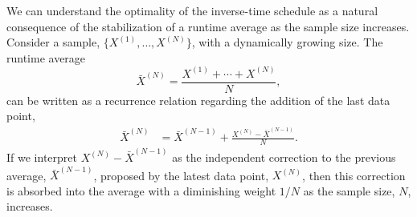 \documentclass[reprint, superscriptaddress, floatfix]{revtex4-1}
\begin{document}
We can understand the optimality of the inverse-time schedule
as a natural consequence of the stabilization of a runtime average
as the sample size increases\cite{
  marsili2006, barducci2008}.
%
Consider a sample, $\{X^{(1)}, \dots, X^{(N)}\}$,
with a dynamically growing size.
%
The runtime average
%
\begin{equation*}
  {\bar X}^{(N)}
  =
  \frac{ X^{(1)} + \cdots + X^{(N)} } { N }
  ,
\end{equation*}
%
can be written as a recurrence relation regarding
the addition of the last data point,
%
\begin{align}
  {\bar X}^{(N)}
  &=
  {\bar X}^{(N-1)} + \frac{ X^{(N)} - {\bar X}^{(N-1)} } { N }
  .
  \label{eq:av_recur}
\end{align}
%
If we interpret $X^{(N)} - {\bar X}^{(N-1)}$
as the independent correction to the previous average,
${\bar X}^{(N-1)}$, proposed by the latest data point, $X^{(N)}$,
then this correction is absorbed into the average with
a diminishing weight $1/N$ as the sample size, $N$, increases.
\end{document}

